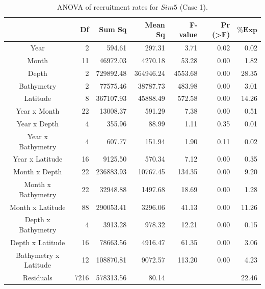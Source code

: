 \begin{table}[H]
\centering
\begin{adjustbox}{width=0.9\textwidth}
\small
\begin{tabular}{c|r|r|r|r|r|r}
\hline
                                  &
	\textbf{Df}                   &
	\textbf{Sum Sq}               &
	\textbf{Mean Sq}              &
	\textbf{F-value}    		   &
	\textbf{Pr (\textgreater{F})} &
	$\mathbf{\% Exp}$      \\
\hline
Year                  & 2    & 594.61    & 297.31    & 3.71    & 0.02                & 0.02  \\
Month                 & 11   & 46972.03  & 4270.18   & 53.28   & 0.00                & 1.82  \\
Depth                 & 2    & 729892.48 & 364946.24 & 4553.68 & 0.00                & 28.35 \\
Bathymetry            & 2    & 77575.46  & 38787.73  & 483.98  & 0.00                & 3.01  \\
Latitude              & 8    & 367107.93 & 45888.49  & 572.58  & 0.00                & 14.26 \\
Year x Month          & 22   & 13008.37  & 591.29    & 7.38    & 0.00                & 0.51  \\
Year x Depth          & 4    & 355.96    & 88.99     & 1.11    & 0.35                & 0.01  \\
Year x Bathymetry     & 4    & 607.77    & 151.94    & 1.90    & 0.11                & 0.02  \\
Year x Latitude       & 16   & 9125.50   & 570.34    & 7.12    & 0.00                & 0.35  \\
Month x Depth         & 22   & 236883.93 & 10767.45  & 134.35  & 0.00                & 9.20  \\
Month x Bathymetry    & 22   & 32948.88  & 1497.68   & 18.69   & 0.00                & 1.28  \\
Month x Latitude      & 88   & 290053.41 & 3296.06   & 41.13   & 0.00                & 11.26 \\
Depth x Bathymetry    & 4    & 3913.28   & 978.32    & 12.21   & 0.00                & 0.15  \\
Depth x Latitude      & 16   & 78663.56  & 4916.47   & 61.35   & 0.00                & 3.06  \\
Bathymetry x Latitude & 12   & 108870.81 & 9072.57   & 113.20  & 0.00                & 4.23  \\
Residuals             & 7216 & 578313.56 & 80.14     &         &                     & 22.46 \\
\hline
\end{tabular}
\end{adjustbox}
\caption{ANOVA of recruitment rates for $Sim 5$ (Case 1).}
\label{ANOVAsim5}
\end{table}

